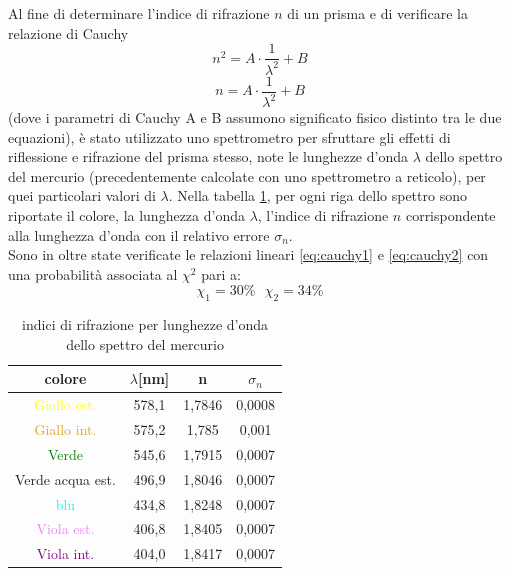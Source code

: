 \documentclass{article}
\begin{document}
        Al fine di determinare l'indice di rifrazione $n$ di un prisma e di verificare la relazione di Cauchy
        \begin{equation}
            n^2 = A \cdot \frac{1}{\lambda^2} + B 
            \label{eq:cauchy1}
        \end{equation}
        \begin{equation}
            n = A \cdot \frac{1}{\lambda^2} + B
            \label{eq:cauchy2}
        \end{equation} 
        (dove i parametri di Cauchy A e B assumono significato fisico distinto tra le due equazioni), 
        è stato utilizzato uno spettrometro per sfruttare gli effetti di riflessione e rifrazione del prisma stesso, 
        note le lunghezze d'onda $\lambda$ dello spettro del mercurio (precedentemente calcolate con uno spettrometro a reticolo),
        per quei particolari valori di $\lambda$. Nella tabella \ref{tabular:spettro}, per ogni riga dello spettro sono riportate il colore, 
        la lunghezza d'onda $\lambda$, l'indice di rifrazione $n$ corrispondente alla lunghezza d'onda con il relativo errore $\sigma_n$.\\
        Sono in oltre state verificate le relazioni lineari \ref{eq:cauchy1} e \ref{eq:cauchy2} con una probabilità associata al $\chi^2$ pari a: 
        \[\chi_1 = 30\% \ \ \ \chi_2 = 34\%   \]

        \begin{table}[H]

            \centering
            \begin{tabular}{c c c c}

                \toprule 
                \textbf{colore} & \textbf{$\lambda$[nm]}  & \textbf{n} & \textbf{$\sigma_n$}  \\

                \midrule
                \textcolor{yellow}{Giallo est.}	            &	578,1	&	1,7846 &   0,0008 \\
                \textcolor{Goldenrod}{Giallo int.}     	    &	575,2	&	1,785  &   0,001  \\
                \textcolor{green}{Verde}                 	&	545,6	&	1,7915 &   0,0007 \\
                \textcolor{Emerald}{Verde acqua est.}	    &	496,9	&   1,8046 &   0,0007 \\
                \textcolor{cyan}{blu}                    	&	434,8	&   1,8248 &   0,0007 \\
                \textcolor{violet}{Viola est.}             	&	406,8	&   1,8405 &   0,0007 \\
                \textcolor{purple}{Viola int.}	            &	404,0	&   1,8417 &   0,0007 \\
                \bottomrule

            \end{tabular}
            
            \caption{indici di rifrazione per lunghezze d'onda dello spettro del mercurio}
            \label{tabular:spettro}

        \end{table}
\end{document}
